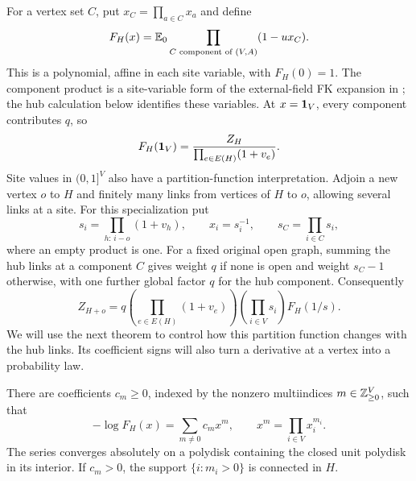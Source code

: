 For a vertex set $C$, put $x_C=\prod_{a\in C}x_a$ and define
\begin{equation}
 F_H(x)=\mathbb E_0\prod_{C\text{ component of }(V,A)}(1-u x_C).
 \label{pressure:polynomial}
\end{equation}
This is a polynomial, affine in each site variable, with $F_H(0)=1$.
The component product is a site-variable form of the external-field
FK expansion in \cite[Section~6]{Sokal2001ComplexZeros}; the hub
calculation below identifies these variables.
At $x=\mathbf 1_V$, every component contributes $q$, so
\[
 F_H(\mathbf 1_V)=\frac{Z_H}{\prod_{e\in E(H)}(1+v_e)}.
\]
Site values in $(0,1]^V$ also have a partition-function interpretation.
Adjoin a new vertex $o$ to $H$ and finitely many links from vertices of
$H$ to $o$, allowing several links at a site. For this specialization put
\[
 s_i=\prod_{h:\,i-o}(1+v_h),\qquad x_i=s_i^{-1},
 \qquad s_C=\prod_{i\in C}s_i,
\]
where an empty product is one. For a fixed original open graph, summing
the hub links at a component $C$ gives weight $q$ if none is open and
weight $s_C-1$ otherwise, with one further global factor $q$ for the
hub component. Consequently
\begin{equation}
 Z_{H+o}=q\left(\prod_{e\in E(H)}(1+v_e)\right)
              \left(\prod_{i\in V}s_i\right)F_H(1/s).
 \label{pressure:hub-partition}
\end{equation}
We will use the next theorem to control how this partition function
changes with the hub links. Its coefficient signs will also turn a
derivative at a vertex into a probability law.

\begin{theorem}
\label{thm:pressure}
There are coefficients $c_m\ge0$, indexed by the nonzero multiindices
$m\in\mathbb Z_{\ge0}^{V}$, such that
\begin{equation}
 -\log F_H(x)=\sum_{m\ne0}c_m x^m,
 \qquad x^m=\prod_{i\in V}x_i^{m_i}.
 \label{pressure:series}
\end{equation}
The series converges absolutely on a polydisk containing the closed
unit polydisk in its interior. If $c_m>0$, the support
$\{i:m_i>0\}$ is connected in $H$.
\end{theorem}

